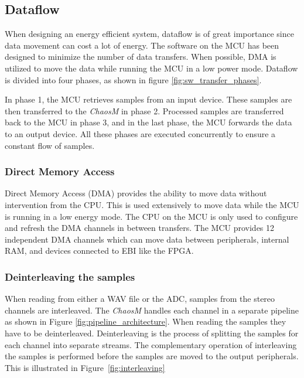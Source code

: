 
\subsection{Dataflow}\label{sec:dataflow}

When designing an energy efficient system, dataflow is of great importance since
data movement can cost a lot of energy. The software on the MCU
has been designed to minimize the number of data transfers. When
possible, DMA is utilized to move the data while running the MCU in a low power
mode. Dataflow is divided into four phases, as shown in figure
\ref{fig:sw_transfer_phases}.

In phase 1, the MCU retrieves samples from an input device. These samples
are then transferred to the \textit{ChaosM} in phase 2. Processed samples are transferred back to the MCU in phase 3, and in the
last phase, the MCU forwards the data to an output device. All these
phases are executed concurrently to ensure a constant flow of samples.



\subsubsection{Direct Memory Access}

Direct Memory Access (DMA) provides the ability to move data without
intervention from the CPU. This is used extensively to move data while the
MCU is running in a low energy mode. The CPU on the MCU is only used to
configure and refresh the DMA channels in between transfers. The MCU provides 12
independent DMA channels which can move data between peripherals, internal RAM,
and devices connected to EBI like the FPGA.

% 

\subsubsection{Deinterleaving the samples}

When reading from either a WAV file or the ADC, samples from the stereo channels
are interleaved. The \textit{ChaosM} handles each channel in a separate pipeline as shown
in Figure \ref{fig:pipeline_architecture}. When reading the samples they have to be
deinterleaved. Deinterleaving is the process of splitting the samples for each
channel into separate streams. The complementary operation of interleaving the
samples is performed before the samples are moved to the output peripherals. This is
illustrated in Figure~\ref{fig:interleaving}

